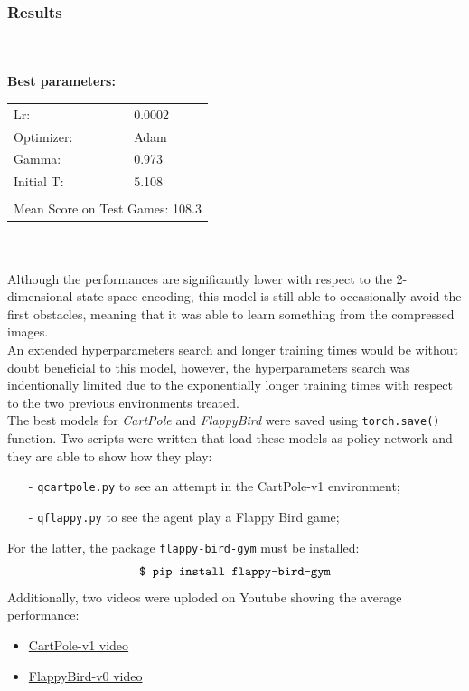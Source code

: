 \documentclass[11pt,a4paper,twocolumn]{IEEEtran}
\newcommand{\thinsepline}{\noindent\makebox[\linewidth]{\rule{7.5cm}{0.02pt}}}
\begin{document}
			\subsubsection{\textbf{Results}}\text{   }\\
			\thinsepline\\
			\textbf{Best parameters:}\medskip\\
			\begin{tabular}{ll}
				Lr: & 0.0002 \\
				Optimizer: & Adam \\
				Gamma: & 0.973 \\
				Initial T:& 5.108 \\
				\hline\\
				\multicolumn{2}{l}{Mean Score on Test Games: 108.3 }
				
			\end{tabular}\\
			\thinsepline\medskip\\
			Although the performances are significantly lower with respect to the 2-dimensional state-space encoding, this model is still able to occasionally avoid the first obstacles, meaning that it was able to learn something from the compressed images.\\
			An extended hyperparameters search and longer training times would be without doubt beneficial to this model, however, the hyperparameters search was indentionally limited due to the exponentially longer training times with respect to the two previous environments treated.\medskip\\
			The best models for \textit{CartPole} and \textit{FlappyBird} were saved using \texttt{torch.save()} function. Two scripts were written that load these models as policy network and they are able to show how they play:
			\begin{itemize}
				\item[-] \texttt{qcartpole.py} to see an attempt in the CartPole-v1 environment;
				\item[-] \texttt{qflappy.py} to see the agent play a Flappy Bird game;
			\end{itemize}
			For the latter, the package \texttt{flappy-bird-gym} must be installed\cite{GHFB}:
			$$\text{\texttt{\$ pip install flappy-bird-gym}}$$
			\newpage
			Additionally, two videos were uploded on Youtube showing the average performance:
			\begin{itemize}
				\item \href{https://www.youtube.com/watch?v=LSkuY9bjZlo}{CartPole-v1 video}
				\item \href{https://www.youtube.com/watch?v=QKapLxaR-3Q&t=14s}{FlappyBird-v0 video}
			\end{itemize} 
			
\end{document}

